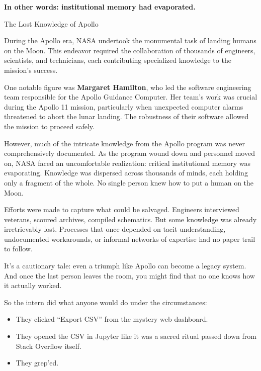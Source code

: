 \textbf{In other words: institutional memory had evaporated.}

\begin{HistoricalSidebar}{The Lost Knowledge of Apollo}

    During the Apollo era, NASA undertook the monumental task of landing humans on the Moon. This endeavor required the collaboration of thousands of engineers, scientists, and technicians, each contributing specialized knowledge to the mission's success.

    \medskip
    
    One notable figure was \textbf{Margaret Hamilton}, who led the software engineering team responsible for the Apollo Guidance Computer. Her team's work was crucial during the Apollo 11 mission, particularly when unexpected computer alarms threatened to abort the lunar landing. The robustness of their software allowed the mission to proceed safely.

    \medskip
    
    However, much of the intricate knowledge from the Apollo program was never comprehensively documented. As the program wound down and personnel moved on, NASA faced an uncomfortable realization: critical institutional memory was evaporating. Knowledge was dispersed across thousands of minds, each holding only a fragment of the whole. No single person knew how to put a human on the Moon.

    \medskip
    
    Efforts were made to capture what could be salvaged. Engineers interviewed veterans, scoured archives, compiled schematics. But some knowledge was already irretrievably lost. Processes that once depended on tacit understanding, undocumented workarounds, or informal networks of expertise had no paper trail to follow.

    \medskip
    
    It’s a cautionary tale: even a triumph like Apollo can become a legacy system. And once the last person leaves the room, you might find that no one knows how it actually worked.
    
\end{HistoricalSidebar}


So the intern did what anyone would do under the circumstances:



\begin{itemize}
    \item They clicked “Export CSV” from the mystery web dashboard.
    \item They opened the CSV in Jupyter like it was a sacred ritual passed down from Stack Overflow itself.
    \item They grep’ed.
\end{itemize}

